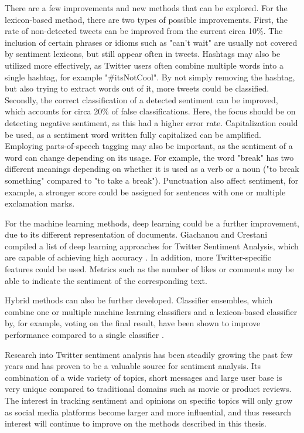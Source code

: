There are a few improvements and new methods that can be explored. For the lexicon-based method, there are two types of possible improvements. First, the rate of non-detected tweets can be improved from the current circa 10\%. The inclusion of certain phrases or idioms such as "can't wait" are usually not covered by sentiment lexicons, but still appear often in tweets. Hashtags may also be utilized more effectively, as Twitter users often combine multiple words into a single hashtag, for example "\#itsNotCool". By not simply removing the hashtag, but also trying to extract words out of it, more tweets could be classified. Secondly, the correct classification of a detected sentiment can be improved, which accounts for circa 20\% of false classifications. Here, the focus should be on detecting negative sentiment, as this had a higher error rate. Capitalization could be used, as a sentiment word written fully capitalized can be amplified. Employing parts-of-speech tagging may also be important, as the sentiment of a word can change depending on its usage. For example, the word "break" has two different meanings depending on whether it is used as a verb or a noun ("to break something" compared to "to take a break"). Punctuation also affect sentiment, for example, a stronger score could be assigned for sentences with one or multiple exclamation marks.

For the machine learning methods, deep learning could be a further improvement, due to its different representation of documents. Giachanou and Crestani compiled a list of deep learning approaches for Twitter Sentiment Analysis, which are capable of achieving high accuracy \cite{DBLP:journals/csur/GiachanouC16}. In addition, more Twitter-specific features could be used. Metrics such as the number of likes or comments may be able to indicate the sentiment of the corresponding text.

Hybrid methods can also be further developed. Classifier ensembles, which combine one or multiple machine learning classifiers and a lexicon-based classifier by, for example, voting on the final result, have been shown to improve performance compared to a single classifier \cite{DBLP:journals/csur/GiachanouC16}.

Research into Twitter sentiment analysis has been steadily growing the past few years and has proven to be a valuable source for sentiment analysis. Its combination of a wide variety of topics, short messages and large user base is very unique compared to traditional domains such as movie or product reviews. The interest in tracking sentiment and opinions on specific topics will only grow as social media platforms become larger and more influential, and thus research interest will continue to improve on the methods described in this thesis.

